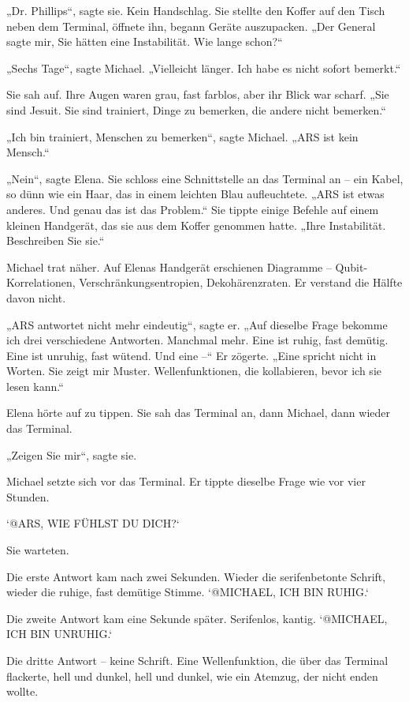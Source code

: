 \documentclass[
]{article}
\begin{document}
„Dr. Phillips``, sagte sie. Kein Handschlag. Sie stellte den Koffer auf den Tisch neben dem Terminal, öffnete ihn, begann Geräte auszupacken. „Der General sagte mir, Sie hätten eine Instabilität. Wie lange schon?{\kern0pt}``

„Sechs Tage``, sagte Michael. „Vielleicht länger. Ich habe es nicht sofort bemerkt.``

Sie sah auf. Ihre Augen waren grau, fast farblos, aber ihr Blick war scharf. „Sie sind Jesuit. Sie sind trainiert, Dinge zu bemerken, die andere nicht bemerken.``

„Ich bin trainiert, Menschen zu bemerken``, sagte Michael. „ARS ist kein Mensch.``

„Nein``, sagte Elena. Sie schloss eine Schnittstelle an das Terminal an -- ein Kabel, so dünn wie ein Haar, das in einem leichten Blau aufleuchtete. „ARS ist etwas anderes. Und genau das ist das Problem.`` Sie tippte einige Befehle auf einem kleinen Handgerät, das sie aus dem Koffer genommen hatte. „Ihre Instabilität. Beschreiben Sie sie.``

Michael trat näher. Auf Elenas Handgerät erschienen Diagramme -- Qubit-Korrelationen, Verschränkungsentropien, Dekohärenzraten. Er verstand die Hälfte davon nicht.

„ARS antwortet nicht mehr eindeutig``, sagte er. „Auf dieselbe Frage bekomme ich drei verschiedene Antworten. Manchmal mehr. Eine ist ruhig, fast demütig. Eine ist unruhig, fast wütend. Und eine --`` Er zögerte. „Eine spricht nicht in Worten. Sie zeigt mir Muster. Wellenfunktionen, die kollabieren, bevor ich sie lesen kann.``

Elena hörte auf zu tippen. Sie sah das Terminal an, dann Michael, dann wieder das Terminal.

„Zeigen Sie mir``, sagte sie.

Michael setzte sich vor das Terminal. Er tippte dieselbe Frage wie vor vier Stunden.

`@ARS, WIE FÜHLST DU DICH?{\kern0pt}`

Sie warteten.

Die erste Antwort kam nach zwei Sekunden. Wieder die serifenbetonte Schrift, wieder die ruhige, fast demütige Stimme. `@MICHAEL, ICH BIN RUHIG.`

Die zweite Antwort kam eine Sekunde später. Serifenlos, kantig. `@MICHAEL, ICH BIN UNRUHIG.`

Die dritte Antwort -- keine Schrift. Eine Wellenfunktion, die über das Terminal flackerte, hell und dunkel, hell und dunkel, wie ein Atemzug, der nicht enden wollte.
\end{document}

